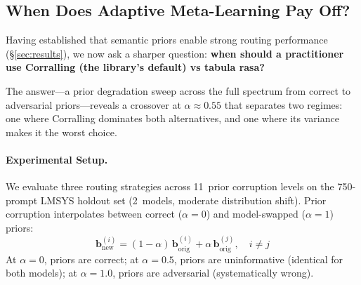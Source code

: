 
\providecommand{\CrossoverWC}{0.55}

\subsection{When Does Adaptive Meta-Learning Pay Off?}
\label{sec:metalearning_cost}

Having established that semantic priors enable strong routing
performance (\S\ref{sec:results}), we now ask a sharper question:
\textbf{when should a practitioner use Corralling (the library's
default) vs tabula rasa?}

The answer---a prior degradation sweep across the full spectrum from
correct to adversarial priors---reveals a crossover at
$\alpha{\approx}0.55$ that separates two regimes: one where Corralling
dominates both alternatives, and one where its variance makes it
the worst choice.

\paragraph{Experimental Setup.}
We evaluate three routing strategies across 11~prior corruption levels
on the 750-prompt LMSYS holdout set (2~models, moderate distribution
shift).  Prior corruption interpolates between correct ($\alpha{=}0$)
and model-swapped ($\alpha{=}1$) priors:
%
\begin{equation}
    \mathbf{b}_{\text{new}}^{(i)} = (1{-}\alpha)\,\mathbf{b}_{\text{orig}}^{(i)}
    + \alpha\,\mathbf{b}_{\text{orig}}^{(j)}, \quad i \neq j
\end{equation}
%
At $\alpha{=}0$, priors are correct; at $\alpha{=}0.5$, priors are
uninformative (identical for both models); at $\alpha{=}1.0$, priors
are adversarial (systematically wrong).

